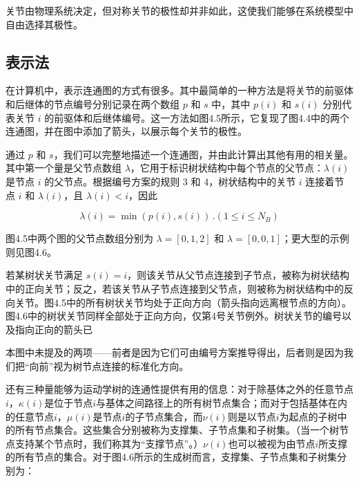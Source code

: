 \documentclass[10pt,a4paper]{book}
\theoremstyle{thmstyle} %
\theoremstyle{defstyle} %
\theoremstyle{prostyle} %
\begin{document}
关节由物理系统决定，但对称关节的极性却并非如此，这使我们能够在系统模型中自由选择其极性。



\subsection{表示法}





在计算机中，表示连通图的方式有很多。其中最简单的一种方法是将关节的前驱体和后继体的节点编号分别记录在两个数组 $p$ 和 $s$ 中，其中 $p(i)$ 和 $s(i)$ 分别代表关节 $i$ 的前驱体和后继体编号。这一方法如图4.5所示，它复现了图4.4中的两个连通图，并在图中添加了箭头，以展示每个关节的极性。



通过 $p$ 和 $s$，我们可以完整地描述一个连通图，并由此计算出其他有用的相关量。其中第一个量是父节点数组 $\lambda$，它用于标识树状结构中每个节点的父节点：$\lambda(i)$ 是节点 $i$ 的父节点。根据编号方案的规则 3 和 4，树状结构中的关节 $i$ 连接着节点 $i$ 和 $\lambda(i)$，且 $\lambda(i) < i$，因此



$$
\lambda ( i ) = \operatorname* { m i n } ( p ( i ) , s ( i ) ) \, .  ( 1 \leq i \leq N _ { B } )
$$



图4.5中两个图的父节点数组分别为 $\lambda = [0,1,2]$ 和 $\lambda = [0,0,1]$；更大型的示例则见图4.6。



若某树状关节满足 $s(i)=i$，则该关节从父节点连接到子节点，被称为树状结构中的正向关节；反之，若该关节从子节点连接到父节点，则被称为树状结构中的反向关节。图4.5中的所有树状关节均处于正向方向（箭头指向远离根节点的方向）。图4.6中的树状关节同样全部处于正向方向，仅第4号关节例外。树状关节的编号以及指向正向的箭头已



本图中未提及的两项——前者是因为它们可由编号方案推导得出，后者则是因为我们把“向前”视为树节点连接的标准化方向。



还有三种量能够为运动学树的连通性提供有用的信息：对于除基体之外的任意节点$i$，$\kappa(i)$是位于节点$i$与基体之间路径上的所有树节点集合；而对于包括基体在内的任意节点$i$，$\mu(i)$是节点$i$的子节点集合，而$\nu(i)$则是以节点$i$为起点的子树中的所有节点集合。这些集合分别被称为支撑集、子节点集和子树集。（当一个树节点支持某个节点时，我们称其为“支撑节点”。）$\nu(i)$也可以被视为由节点$i$所支撑的所有节点的集合。对于图4.6所示的生成树而言，支撑集、子节点集和子树集分别为：
\end{document}
